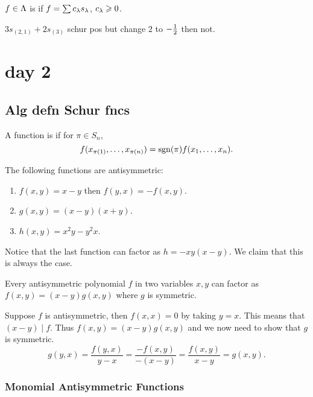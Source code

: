 \documentclass[12pt]{memoir}
\begin{document}
\begin{Def}
    $f\in\Lambda$ is  if $f=\sum c_\lambda s_\lambda$, $c_\lambda\geqslant 0$.
\end{Def}

\begin{Ex}
    $3s_{(2,1)}+2s_{(3)}$ schur pos but change $2$ to $-\half$ then not.
\end{Ex}

\section{day 2}

\subsection*{Alg defn Schur fncs}

\begin{Def}
    A function is  if for $\pi\in S_n$,
    $$f(x_{\pi(1)},\dots,x_{\pi(n)})=\operatorname{sgn}(\pi)f(x_1,\dots,x_n).$$
\end{Def}

\begin{Ex}
    The following functions are antisymmetric:
    \begin{enumerate}
        \itemsep=-0.4em
        \item $f(x,y)=x-y$ then $f(y,x)=-f(x,y)$.
        \item $g(x,y)=(x-y)(x+y)$.
        \item $h(x,y)=x^2y-y^2x$.
    \end{enumerate}
\end{Ex}

Notice that the last function can factor as $h=-xy(x-y)$. We claim that this is always the case.

\begin{Lem} 
    Every antisymmetric polynomial $f$ in two variables $x,y$ can factor as $f(x,y)=(x-y)g(x,y)$ where $g$ is symmetric.
\end{Lem}

\begin{ptcbp}
Suppose $f$ is antisymmetric, then $f(x,x)=0$ by taking $y=x$. This means that $(x-y)\mid f$. Thus $f(x,y)=(x-y)g(x,y)$ and we now need to show that $g$ is symmetric. 
$$g(y,x)=\frac{f(y,x)}{y-x}=\frac{-f(x,y)}{-(x-y)}=\frac{f(x,y)}{x-y}=g(x,y).$$
\end{ptcbp}

\subsubsection*{Monomial Antisymmetric Functions}
\end{document}
